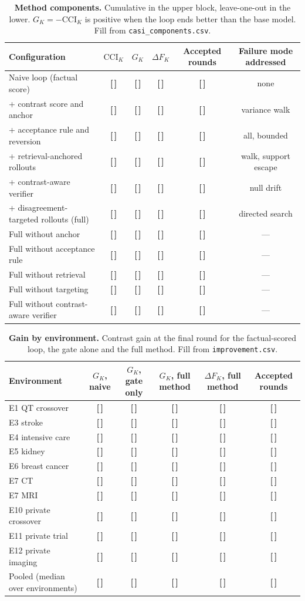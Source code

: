 \documentclass[11pt,a4paper]{article}
\newcommand{\T}{{\color{red}\textbf{[\,]}}}
\newcommand{\CCI}{\mathrm{CCI}}
\begin{document}
\begin{table}[!htbp]\centering\scriptsize
\caption{\textbf{Method components.} Cumulative in the upper block, leave-one-out in the lower. $G_K=-\CCI_K$ is positive when the loop ends better than the base model. Fill from \texttt{casi\_components.csv}.}
\label{tab:s44}
\begin{tabularx}{\textwidth}{@{}p{3.9cm} C C C C C@{}}\toprule
Configuration & $\CCI_K$ & $G_K$ & $\Delta F_K$ & Accepted rounds & Failure mode addressed\\\midrule
Naive loop (factual score) & \T & \T & \T & \T & none\\
+ contrast score and anchor & \T & \T & \T & \T & variance walk\\
+ acceptance rule and reversion & \T & \T & \T & \T & all, bounded\\
+ retrieval-anchored rollouts & \T & \T & \T & \T & walk, support escape\\
+ contrast-aware verifier & \T & \T & \T & \T & null drift\\
+ disagreement-targeted rollouts (full) & \T & \T & \T & \T & directed search\\
\midrule
Full without anchor & \T & \T & \T & \T & ---\\
Full without acceptance rule & \T & \T & \T & \T & ---\\
Full without retrieval & \T & \T & \T & \T & ---\\
Full without targeting & \T & \T & \T & \T & ---\\
Full without contrast-aware verifier & \T & \T & \T & \T & ---\\
\bottomrule\end{tabularx}
\end{table}
\FloatBarrier
\begin{table}[!htbp]\centering\footnotesize
\caption{\textbf{Gain by environment.} Contrast gain at the final round for the factual-scored loop, the gate alone and the full method. Fill from \texttt{improvement.csv}.}
\label{tab:s45}
\begin{tabularx}{\textwidth}{@{}p{3.9cm} C C C C C@{}}\toprule
Environment & $G_K$, naive & $G_K$, gate only & $G_K$, full method & $\Delta F_K$, full method & Accepted rounds\\\midrule
E1 QT crossover & \T & \T & \T & \T & \T\\
E3 stroke & \T & \T & \T & \T & \T\\
E4 intensive care & \T & \T & \T & \T & \T\\
E5 kidney & \T & \T & \T & \T & \T\\
E6 breast cancer & \T & \T & \T & \T & \T\\
E7 CT & \T & \T & \T & \T & \T\\
E7 MRI & \T & \T & \T & \T & \T\\
E10 private crossover & \T & \T & \T & \T & \T\\
E11 private trial & \T & \T & \T & \T & \T\\
E12 private imaging & \T & \T & \T & \T & \T\\
\midrule
Pooled (median over environments) & \T & \T & \T & \T & \T\\
\bottomrule\end{tabularx}
\end{table}
\end{document}
